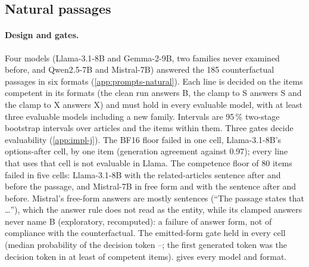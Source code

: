 \subsection{Natural passages}\label{app:natural}

\paragraph{Design and gates.} Four models (Llama-3.1-8B and Gemma-2-9B, two families never examined before, and Qwen2.5-7B and Mistral-7B) answered the 185 counterfactual passages in six formats (\cref{app:prompts-natural}). Each line is decided on the items competent in its formats (the clean run answers B, the clamp to S answers S and the clamp to X answers X) and must hold in every evaluable model, with at least three evaluable models including a new family. Intervals are 95\,\% two-stage bootstrap intervals over articles and the items within them. Three gates decide evaluability (\cref{app:impl-j}). The BF16 floor failed in one cell, Llama-3.1-8B's options-after cell, by one item (generation agreement \JaGoneAgreeOptaLlamaEight{} against 0.97); every line that uses that cell is not evaluable in Llama. The competence floor of 80 items failed in five cells: Llama-3.1-8B with the related-articles sentence after and before the passage, and Mistral-7B in free form and with the sentence after and before. Mistral's free-form answers are mostly sentences (``The passage states that \ldots''), which the answer rule does not read as the entity, while its clamped answers never name B (exploratory, recomputed): a failure of answer form, not of compliance with the counterfactual. The emitted-form gate held in every cell (median probability of the decision token \JaGthreePMin{}--\JaGthreePMax{}; the first generated token was the decision token in at least \JaGthreeGoneMin{} of competent items).  gives every model and format. %

\begin{table}[!ht]
\centering
\caption{\textbf{Natural passages: identity by format.} Counterfactual SQuAD passages, 185 items per model; $n_{\mathrm{comp}}$: items competent in the format; $s_{\mathrm{ID}}$, $\mathrm{ID}_K$ and $\mathrm{ID}_V$ on those items, with 95\,\% two-stage article-cluster intervals. Gate: the preregistered gate that fails in the cell (J-A-G1: BF16 floor; J-A-G2: fewer than 80 competent items); such a cell enters no line. $^\dagger$Computed from the raw results with the scorer's functions, not printed by the scorer (exploratory).}
\label{tab:natural8}

\end{table}

